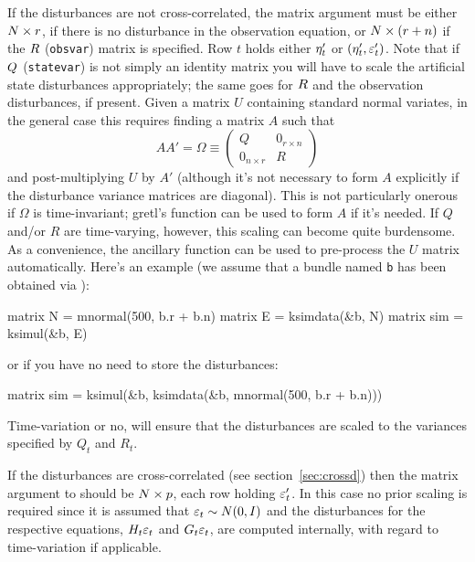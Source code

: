 If the disturbances are not cross-correlated, the matrix argument must
be either $N \times r$, if there is no disturbance in the
observation equation, or $N \times (r + n)$ if the
$R$ (\texttt{obsvar}) matrix is specified. Row $t$ holds either
$\eta_t'$ or $(\eta_t', \varepsilon_t')$. Note that if
$Q$ (\texttt{statevar}) is not simply an identity matrix you
will have to scale the artificial state disturbances appropriately;
the same goes for $R$ and the observation disturbances, if
present. Given a matrix $U$ containing standard normal variates, in
the general case this requires finding a matrix $A$ such that
\[
AA' = \Omega \equiv \left(
\begin{array}{ll}
Q & 0_{r \times n} \\
0_{n\times r} & R
\end{array}
\right)
\]
and post-multiplying $U$ by $A'$ (although it's not necessary to form
$A$ explicitly if the disturbance variance matrices are
diagonal). This is not particularly onerous if $\Omega$ is
time-invariant; gretl's  function can be used to form $A$
if it's needed. If $Q$ and/or $R$ are time-varying, however, this
scaling can become quite burdensome. As a convenience, the ancillary
function  can be used to pre-process the $U$ matrix
automatically. Here's an example (we assume that a bundle named
\texttt{b} has been obtained via ):
%
\begin{code}
matrix N = mnormal(500, b.r + b.n)
matrix E = ksimdata(&b, N)
matrix sim = ksimul(&b, E)
\end{code}
%
or if you have no need to store the disturbances:
%
\begin{code}
matrix sim = ksimul(&b, ksimdata(&b, mnormal(500, b.r + b.n)))
\end{code}
%
Time-variation or no,  will ensure that the
disturbances are scaled to the variances specified by $Q_t$ and $R_t$.

If the disturbances are cross-correlated (see
section~\ref{sec:crossd}) then the matrix argument to 
should be $N \times p$, each row holding $\varepsilon_t'$. In this case
no prior scaling is required since it is assumed that
$\varepsilon_t \sim N(0, I)$ and the disturbances for the respective
equations, $H_t \varepsilon_t$ and $G_t \varepsilon_t$,
are computed internally, with regard to time-variation if applicable.

